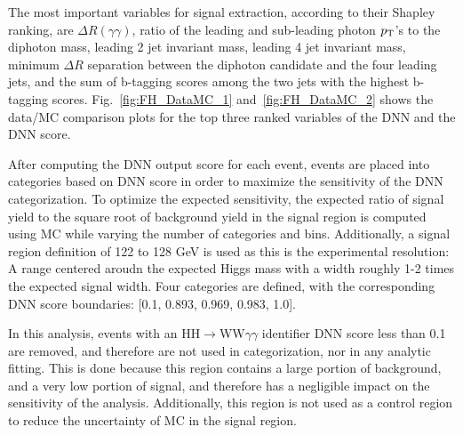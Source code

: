 The most important variables for signal extraction, according to their Shapley ranking, are $\Delta R (\gamma\gamma)$, 
ratio of the leading and sub-leading photon $p_{\mathrm{T}}$'s to the diphoton mass,
leading 2 jet invariant mass, leading 4 jet invariant mass, minimum $\Delta R$ separation between
the diphoton candidate and the four leading jets, and the sum of b-tagging scores among the two jets with the highest
b-tagging scores. Fig.~\ref{fig:FH_DataMC_1} and~\ref{fig:FH_DataMC_2} shows the data/MC comparison plots for the top three ranked variables of the DNN and the DNN score.

After computing the DNN output score for each event, events are placed into categories based on DNN score in order to maximize the sensitivity of the DNN categorization. 
To optimize the expected sensitivity, the expected ratio of signal yield to the square root of background yield in the signal region is computed using MC while varying the number of categories and bins. 
Additionally, a signal region definition of 122 to 128 GeV is used as this is the experimental resolution: A range centered aroudn the expected Higgs mass with a width roughly 1-2 times 
the expected signal width. Four categories are defined, with the corresponding DNN score boundaries: [0.1, 0.893, 0.969, 0.983, 1.0].

In this analysis, events with an HH$\rightarrow$WW$\gamma\gamma$ identifier DNN score less than 0.1 
are removed, and therefore are not used in categorization, nor in any analytic fitting. This is done because this region contains a large portion of background, and a very low portion of signal, and therefore has a negligible impact on the sensitivity of the analysis. Additionally,
this region is not used as a control region to reduce the uncertainty of MC in the signal region.


